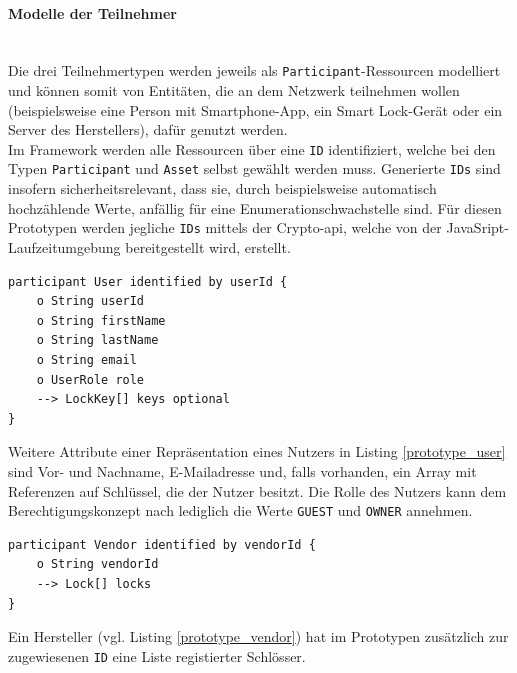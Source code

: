         \paragraph{\textrm{Modelle der Teilnehmer}}\hspace{0cm}\\
            Die drei Teilnehmertypen werden jeweils als \colorbox{light-gray}{\lstinline{Participant}}-Ressourcen modelliert und können somit von Entitäten, die an dem Netzwerk teilnehmen wollen (beispielsweise eine Person mit Smartphone-App, ein Smart Lock-Gerät oder ein Server des Herstellers), dafür genutzt werden. 
            \medskip\\
            Im Framework werden alle Ressourcen über eine \colorbox{light-gray}{\lstinline{ID}} identifiziert, welche bei den Typen \colorbox{light-gray}{\lstinline{Participant}} und \colorbox{light-gray}{\lstinline{Asset}} selbst gewählt werden muss. 
            Generierte \colorbox{light-gray}{\lstinline{IDs}} sind insofern sicherheitsrelevant, dass sie, durch beispielsweise automatisch hochzählende Werte, anfällig für eine Enumerationschwachstelle sind. 
            Für diesen Prototypen werden jegliche \colorbox{light-gray}{\lstinline{IDs}} mittels der Crypto-\gls{api}, welche von der JavaSript-Laufzeitumgebung bereitgestellt wird, erstellt.
            \medskip
            \begin{lstlisting}[caption={Repräsantation eines Nutzers},label=prototype_user,captionpos=b]
participant User identified by userId {
    o String userId
    o String firstName
    o String lastName
    o String email
    o UserRole role
    --> LockKey[] keys optional
}
            \end{lstlisting}
            \noindent Weitere Attribute einer Repräsentation eines Nutzers in Listing \ref{prototype_user} sind Vor- und Nachname, E-Mailadresse und, falls vorhanden, ein Array mit Referenzen auf Schlüssel, die der Nutzer besitzt. 
            Die Rolle des Nutzers kann dem Berechtigungskonzept nach lediglich die Werte \colorbox{light-gray}{\lstinline{GUEST}} und \colorbox{light-gray}{\lstinline{OWNER}} annehmen. 
            \medskip
            \begin{lstlisting}[caption={Repräsantation eines Herstellers},label=prototype_vendor,captionpos=b]
participant Vendor identified by vendorId {
    o String vendorId
    --> Lock[] locks
}
            \end{lstlisting}
            Ein Hersteller (vgl. Listing \ref{prototype_vendor}) hat im Prototypen zusätzlich zur zugewiesenen \colorbox{light-gray}{\lstinline{ID}} eine Liste registierter Schlösser.
